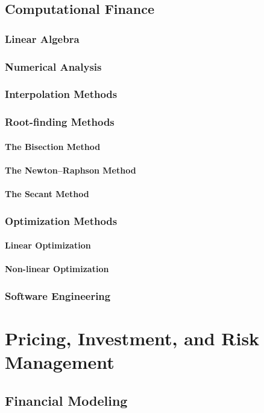 \documentclass{book}
\begin{document}
\chapter{Computational Finance}
\section{Linear Algebra}
\section{Numerical Analysis}
\section{Interpolation Methods}
\section{Root-finding Methods}
\subsection{The Bisection Method}
\subsection{The Newton--Raphson Method}
\subsection{The Secant Method}
\section{Optimization Methods}
\subsection{Linear Optimization}
\subsection{Non-linear Optimization}
\section{Software Engineering}


\part{Pricing, Investment, and Risk Management}
\chapter{Financial Modeling}
\end{document}
